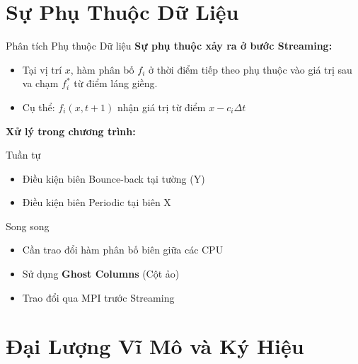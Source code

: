 \documentclass[t, aspectratio=169]{beamer}
\begin{document}
	\section{Sự Phụ Thuộc Dữ Liệu}
	
	\begin{frame}{Phân tích Phụ thuộc Dữ liệu}
		\textbf{Sự phụ thuộc xảy ra ở bước Streaming:}
		\begin{itemize}
			\item Tại vị trí $x$, hàm phân bố $f_i$ ở thời điểm tiếp theo phụ thuộc vào giá trị sau va chạm $f^*_i$ từ điểm láng giềng.
			\item Cụ thể: $f_i(x, t+1)$ nhận giá trị từ điểm $x - c_i \Delta t$
		\end{itemize}
		
		\vspace{1em}
		
		\textbf{Xử lý trong chương trình:}
		\begin{block}{Tuần tự}
			\begin{itemize}
				\item Điều kiện biên Bounce-back tại tường (Y)
				\item Điều kiện biên Periodic tại biên X
			\end{itemize}
		\end{block}
		
		\begin{alertblock}{Song song}
			\begin{itemize}
				\item Cần trao đổi hàm phân bố biên giữa các CPU
				\item Sử dụng \textbf{Ghost Columns} (Cột ảo)
				\item Trao đổi qua MPI trước Streaming
			\end{itemize}
		\end{alertblock}
	\end{frame}
	
	\section{Đại Lượng Vĩ Mô và Ký Hiệu}
	
\end{document}
